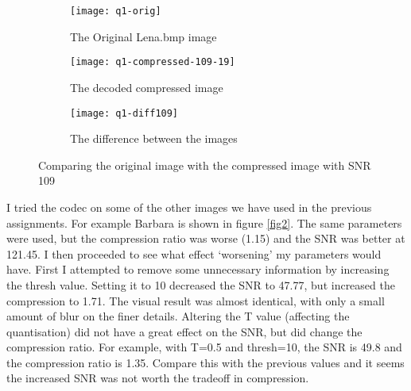 \documentclass[a4paper]{article}
\begin{document}
\begin{figure}
     
         \centering
         \begin{subfigure}[b]{0.25\textwidth}
                 \centering
                 \texttt{[image: q1-orig]}
                 \caption{The Original Lena.bmp image}
                 \label{fig1:orig}
         \end{subfigure}
         \begin{subfigure}[b]{0.25\textwidth}
                 \centering
                 \texttt{[image: q1-compressed-109-19]}
                 \caption{The decoded compressed image}
                 \label{fig1:compressed}
        \end{subfigure}     
	\begin{subfigure}[b]{0.25\textwidth}
                 \centering
                 \texttt{[image: q1-diff109]}
                 \caption{The difference between the images}
                 \label{fig1:diff}
        \end{subfigure}     

        \caption{Comparing the original image with the compressed image with SNR 109}        
        \label{fig1}
 \end{figure}
I tried the codec on some of the other images we have used in the previous assignments. For example Barbara is shown in figure \ref{fig2}. The same parameters were used, but the compression ratio was worse (1.15) and the SNR was better at 121.45. I then proceeded to see what effect `worsening' my parameters would have. First I attempted to remove some unnecessary information by increasing the thresh value. Setting it to 10 decreased the SNR to 47.77, but increased the compression to 1.71. The visual result was almost identical, with only a small amount of blur on the finer details.
Altering the T value (affecting the quantisation) did not have a great effect on the SNR, but did change the compression ratio. For example, with T=0.5 and thresh=10, the SNR is 49.8 and the compression ratio is 1.35. Compare this with the previous values and it seems the increased SNR was not worth the tradeoff in compression.
\end{document}
